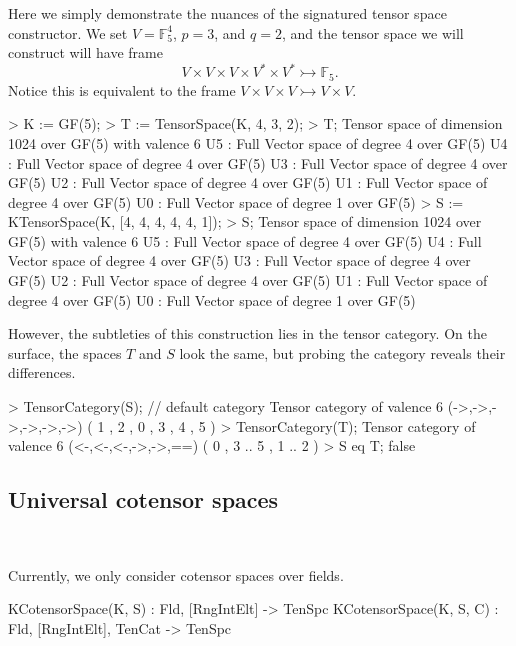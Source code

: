 \begin{example}[SignaturedTenSpc]

Here we simply demonstrate the nuances of the signatured tensor space constructor.
We set $V=\mathbb{F}_5^4$, $p=3$, and $q=2$, and the tensor space we will construct will have frame 
\[ V\times V\times V \times V^* \times V^*\rightarrowtail\mathbb{F}_5. \]
Notice this is equivalent to the frame $V\times V\times V\rightarrowtail V \times V$. 
\begin{code}
> K := GF(5);
> T := TensorSpace(K, 4, 3, 2);
> T;
Tensor space of dimension 1024 over GF(5) with valence 6
U5 : Full Vector space of degree 4 over GF(5)
U4 : Full Vector space of degree 4 over GF(5)
U3 : Full Vector space of degree 4 over GF(5)
U2 : Full Vector space of degree 4 over GF(5)
U1 : Full Vector space of degree 4 over GF(5)
U0 : Full Vector space of degree 1 over GF(5)
> S := KTensorSpace(K, [4, 4, 4, 4, 4, 1]);
> S;
Tensor space of dimension 1024 over GF(5) with valence 6
U5 : Full Vector space of degree 4 over GF(5)
U4 : Full Vector space of degree 4 over GF(5)
U3 : Full Vector space of degree 4 over GF(5)
U2 : Full Vector space of degree 4 over GF(5)
U1 : Full Vector space of degree 4 over GF(5)
U0 : Full Vector space of degree 1 over GF(5)
\end{code}

However, the subtleties of this construction lies in the tensor category. 
On the surface, the spaces $T$ and $S$ look the same, but probing the category reveals their differences.
\begin{code}
> TensorCategory(S); // default category
Tensor category of valence 6 (->,->,->,->,->,->) ({ 1 },{ 2 },{ 0 },{ 3 },{ 4 
},{ 5 })
> TensorCategory(T); 
Tensor category of valence 6 (<-,<-,<-,->,->,==) ({ 0 },{ 3 .. 5 },{ 1 .. 2 })
> S eq T;
false
\end{code}
\end{example}


\subsection{Universal cotensor spaces}~

Currently, we only consider cotensor spaces over fields.

\begin{intrinsics}
KCotensorSpace(K, S) : Fld, [RngIntElt] -> TenSpc
KCotensorSpace(K, S, C) : Fld, [RngIntElt], TenCat -> TenSpc
\end{intrinsics}

